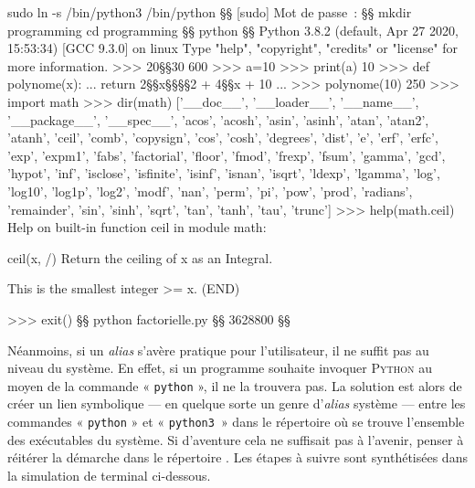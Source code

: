 
\begin{fullwidth}
\begin{ubuntu}
sudo ln -s /bin/python3 /bin/python §\startconsole§
[sudo] Mot de passe :
§§
mkdir programming
cd programming §§
python §\startconsole§
Python 3.8.2 (default, Apr 27 2020, 15:53:34) 
[GCC 9.3.0] on linux
Type "help", "copyright", "credits" or "license" for more information.
>>> 20§\shmult§30
600
>>> a=10
>>> print(a)
10
>>> def polynome(x):
...     return 2§\shmult§x§\shmult§§\shmult§2 + 4§\shmult§x + 10
... 
>>> polynome(10)
250
>>> import math
>>> dir(math)
['__doc__', '__loader__', '__name__', '__package__', '__spec__', 'acos', 'acosh', 'asin', 'asinh', 'atan', 'atan2', 'atanh', 'ceil', 'comb', 'copysign', 'cos', 'cosh', 'degrees', 'dist', 'e', 'erf', 'erfc', 'exp', 'expm1', 'fabs', 'factorial', 'floor', 'fmod', 'frexp', 'fsum', 'gamma', 'gcd', 'hypot', 'inf', 'isclose', 'isfinite', 'isinf', 'isnan', 'isqrt', 'ldexp', 'lgamma', 'log', 'log10', 'log1p', 'log2', 'modf', 'nan', 'perm', 'pi', 'pow', 'prod', 'radians', 'remainder', 'sin', 'sinh', 'sqrt', 'tan', 'tanh', 'tau', 'trunc']
>>> help(math.ceil)
Help on built-in function ceil in module math:

ceil(x, /)
    Return the ceiling of x as an Integral.
    
    This is the smallest integer >= x.
(END)

>>> exit() §§
python factorielle.py §\startconsole§
3628800 §§
\end{ubuntu}
\end{fullwidth}

Néanmoins, si un \textit{alias} s'avère pratique pour l'utilisateur, il ne suffit pas au niveau du système. En effet, si un programme souhaite invoquer \textsc{Python} au moyen de la commande « \texttt{python} », il ne la trouvera pas. La solution est alors de créer un lien symbolique --- en quelque sorte un genre d'\textit{alias} système --- entre les commandes « \texttt{python} » et « \texttt{python3}~» dans le répertoire  où se trouve l'ensemble des exécutables du système. Si d'aventure cela ne suffisait pas à l'avenir, penser à réitérer la démarche dans le répertoire . Les étapes à suivre sont synthétisées dans la simulation de terminal ci-dessous.

